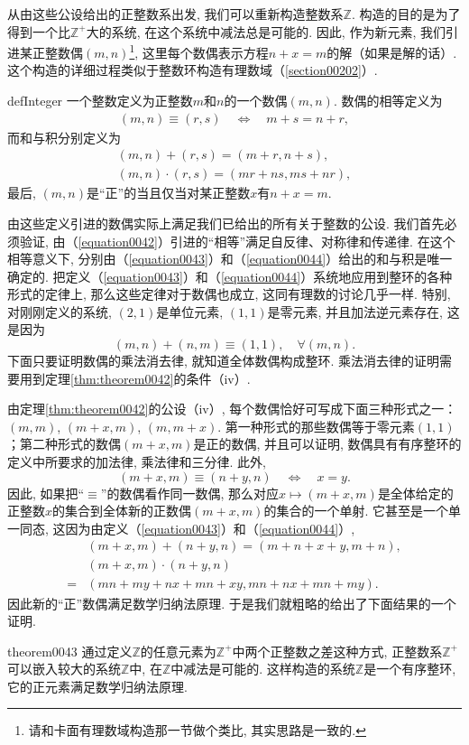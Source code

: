 从由这些公设给出的正整数系出发, 我们可以重新构造整数系$\mathbb{Z}$. 构造的目的是为了得到一个比$\mathbb{Z}^+$大的系统, 在这个系统中减法总是可能的. 因此, 作为新元素, 我们引进某正整数偶$(m,n)$\footnote{请和卡面有理数域构造那一节做个类比, 其实思路是一致的. }, 这里每个数偶表示方程$n+x=m$的解（如果是解的话）. 这个构造的详细过程类似于整数环构造有理数域（\ref{section00202}）. 
\begin{definition}{}{defInteger}
一个整数定义为正整数$m$和$n$的一个数偶$(m,n)$. 数偶的相等定义为
\begin{gather}\label{equation0042}
(m,n)\equiv(r,s) \quad\Leftrightarrow\quad m+s = n+ r,
\end{gather}
而和与积分别定义为
\begin{gather}
(m,n)+(r, s) = (m+r, n+s), \label{equation0043}\\
(m,n)\cdot(r,s)=(mr+ns, ms+nr),\label{equation0044}
\end{gather}
最后, $(m,n)$是“正”的当且仅当对某正整数$x$有$n+x=m$. 
\end{definition}

由这些定义引进的数偶实际上满足我们已给出的所有关于整数的公设. 我们首先必须验证, 由（\ref{equation0042}）引进的“相等”满足自反律、对称律和传递律. 在这个相等意义下, 分别由（\ref{equation0043}）和（\ref{equation0044}）给出的和与积是唯一确定的. 把定义（\ref{equation0043}）和（\ref{equation0044}）系统地应用到整环的各种形式的定律上, 那么这些定律对于数偶也成立, 这同有理数的讨论几乎一样. 特别, 对刚刚定义的系统, $(2,1)$是单位元素, $(1,1)$是零元素, 并且加法逆元素存在, 这是因为
\[
(m,n)+(n,m) \equiv (1,1),\quad \forall (m,n).
\]
下面只要证明数偶的乘法消去律, 就知道全体数偶构成整环. 乘法消去律的证明需要用到定理\ref{thm:theorem0042}的条件（iv）. 

由定理\ref{thm:theorem0042}的公设（iv）, 每个数偶恰好可写成下面三种形式之一：$(m,m)$, $(m+x, m)$, $(m, m+x)$. 第一种形式的那些数偶等于零元素$(1,1)$；第二种形式的数偶$(m+x,m)$是正的数偶, 并且可以证明, 数偶具有有序整环的定义中所要求的加法律, 乘法律和三分律. 此外, 
\[
(m+x, m) \equiv (n+y,n) \quad\Leftrightarrow\quad x=y.
\] 
因此, 如果把“$\equiv$”的数偶看作同一数偶, 那么对应$x \mapsto (m+x,m)$是全体给定的正整数$x$的集合到全体新的正数偶$(m+x, m)$的集合的一个单射. 它甚至是一个单一同态, 这因为由定义（\ref{equation0043}）和（\ref{equation0044}）, 
\[
\begin{aligned}
&(m+x, m) + (n+y, n) = (m+n+x+y,m+n),\\
&(m+x, m)\cdot(n+y, n)\\
=&(mn+my+nx+mn+xy, mn+nx+mn+my).
\end{aligned}
\]
因此新的“正”数偶满足数学归纳法原理. 于是我们就粗略的给出了下面结果的一个证明. 
\begin{theorem}{}{theorem0043}
通过定义$\mathbb{Z}$的任意元素为$\mathbb{Z}^+$中两个正整数之差这种方式, 正整数系$\mathbb{Z}^+$可以嵌入较大的系统$\mathbb{Z}$中, 在$\mathbb{Z}$中减法是可能的. 这样构造的系统$\mathbb{Z}$是一个有序整环, 它的正元素满足数学归纳法原理. 
\end{theorem}

